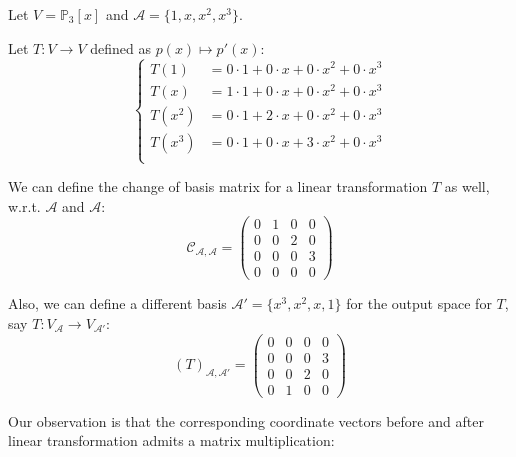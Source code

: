 \begin{example}
Let $V=\mathbb{P}_3[x]$ and $\mathcal{A}=\{1,x,x^2,x^3\}$.

Let $T:V\to V$ defined as $p(x)\mapsto p'(x)$:
\[
\left\{
\begin{aligned}
T(1)&=0\cdot1+0\cdot x+0\cdot x^2+0\cdot x^3\\
T(x)&=1\cdot1+0\cdot x+0\cdot x^2+0\cdot x^3\\
T(x^2)&=0\cdot1+2\cdot x+0\cdot x^2+0\cdot x^3\\
T(x^3)&=0\cdot1+0\cdot x+3\cdot x^2+0\cdot x^3\\
\end{aligned}
\right.
\]

We can define the change of basis matrix for a linear transformation $T$ as well, w.r.t. $\mathcal{A}$ and $\mathcal{A}$:
\[
\mathcal{C}_{\mathcal{A},\mathcal{A}}=\begin{pmatrix}
0&1&0&0\\0&0&2&0\\0&0&0&3\\0&0&0&0
\end{pmatrix}
\]

Also, we can define a different basis $\mathcal{A}'=\{x^3,x^2,x,1\}$ for the output space for $T$, say $T:V_\mathcal{A}\to V_{\mathcal{A}'}$:
\[
(T)_{\mathcal{A},\mathcal{A}'}
=\begin{pmatrix}
0&0&0&0\\0&0&0&3\\0&0&2&0\\0&1&0&0
\end{pmatrix}
\]

Our observation is that the corresponding coordinate vectors before and after linear transformation admits a matrix multiplication:


\end{example}
